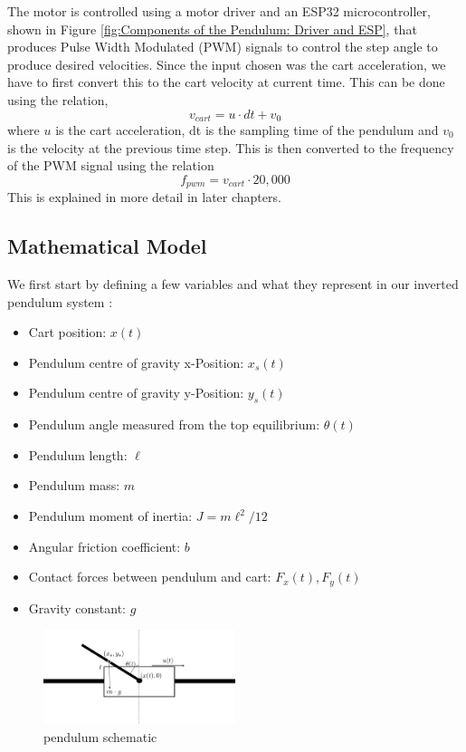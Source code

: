The motor is controlled using a motor driver and an ESP32 microcontroller, shown in Figure \ref{fig:Components of the Pendulum: Driver and ESP}, that produces Pulse Width Modulated (PWM) signals to control the step angle to produce desired velocities. Since the input chosen was the cart acceleration, we have to first convert this to the cart velocity at current time. This can be done using the relation,  $$v_{cart} = u\cdot dt + v_0 $$ 
where $u$ is the cart acceleration, dt is the sampling time of the pendulum and $v_0$ is the velocity at the previous time step. This is then converted to the frequency of the PWM signal using the relation
$$f_{pwm} = v_{cart}\cdot20,000$$
This is explained in more detail in later chapters. 

\subsection{Mathematical Model} 

We first start by defining a few variables and what they represent in our inverted pendulum system : 	
\begin{itemize}
	\item Cart position: $x(t)$
	\item Pendulum centre of gravity x-Position: $x_s(t)$
	\item Pendulum centre of gravity y-Position: $y_s(t)$
	\item Pendulum angle measured from the top equilibrium: $\theta(t)$
	\item Pendulum length: $\ell$
	\item Pendulum mass: $m$
	\item Pendulum moment of inertia: $J = m\ell^2 / 12$
	\item Angular friction coefficient: $b$
	\item Contact forces between pendulum and cart: $F_x(t), F_y(t)$
	\item Gravity constant: $g$
\end{itemize}

\begin{figure}[htbp]
	\centering
	\includegraphics[width=0.5\textwidth]{"src/Images/pendulum1.jpg"}   
	\caption{pendulum schematic}
	\label{fig:Pendulum schematic}
\end{figure}


